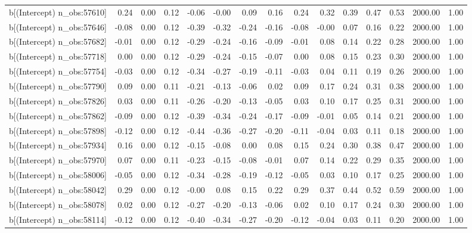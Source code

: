 \begin{table}[ht]
\begin{tabular}{rrrrrrrrrrrrrrr}
  b[(Intercept) n\_obs:57610] & 0.24 & 0.00 & 0.12 & -0.06 & -0.00 & 0.09 & 0.16 & 0.24 & 0.32 & 0.39 & 0.47 & 0.53 & 2000.00 & 1.00 \\ 
  b[(Intercept) n\_obs:57646] & -0.08 & 0.00 & 0.12 & -0.39 & -0.32 & -0.24 & -0.16 & -0.08 & -0.00 & 0.07 & 0.16 & 0.22 & 2000.00 & 1.00 \\ 
  b[(Intercept) n\_obs:57682] & -0.01 & 0.00 & 0.12 & -0.29 & -0.24 & -0.16 & -0.09 & -0.01 & 0.08 & 0.14 & 0.22 & 0.28 & 2000.00 & 1.00 \\ 
  b[(Intercept) n\_obs:57718] & 0.00 & 0.00 & 0.12 & -0.29 & -0.24 & -0.15 & -0.07 & 0.00 & 0.08 & 0.15 & 0.23 & 0.30 & 2000.00 & 1.00 \\ 
  b[(Intercept) n\_obs:57754] & -0.03 & 0.00 & 0.12 & -0.34 & -0.27 & -0.19 & -0.11 & -0.03 & 0.04 & 0.11 & 0.19 & 0.26 & 2000.00 & 1.00 \\ 
  b[(Intercept) n\_obs:57790] & 0.09 & 0.00 & 0.11 & -0.21 & -0.13 & -0.06 & 0.02 & 0.09 & 0.17 & 0.24 & 0.31 & 0.38 & 2000.00 & 1.00 \\ 
  b[(Intercept) n\_obs:57826] & 0.03 & 0.00 & 0.11 & -0.26 & -0.20 & -0.13 & -0.05 & 0.03 & 0.10 & 0.17 & 0.25 & 0.31 & 2000.00 & 1.00 \\ 
  b[(Intercept) n\_obs:57862] & -0.09 & 0.00 & 0.12 & -0.39 & -0.34 & -0.24 & -0.17 & -0.09 & -0.01 & 0.05 & 0.14 & 0.21 & 2000.00 & 1.00 \\ 
  b[(Intercept) n\_obs:57898] & -0.12 & 0.00 & 0.12 & -0.44 & -0.36 & -0.27 & -0.20 & -0.11 & -0.04 & 0.03 & 0.11 & 0.18 & 2000.00 & 1.00 \\ 
  b[(Intercept) n\_obs:57934] & 0.16 & 0.00 & 0.12 & -0.15 & -0.08 & 0.00 & 0.08 & 0.15 & 0.24 & 0.30 & 0.38 & 0.47 & 2000.00 & 1.00 \\ 
  b[(Intercept) n\_obs:57970] & 0.07 & 0.00 & 0.11 & -0.23 & -0.15 & -0.08 & -0.01 & 0.07 & 0.14 & 0.22 & 0.29 & 0.35 & 2000.00 & 1.00 \\ 
  b[(Intercept) n\_obs:58006] & -0.05 & 0.00 & 0.12 & -0.34 & -0.28 & -0.19 & -0.12 & -0.05 & 0.03 & 0.10 & 0.17 & 0.25 & 2000.00 & 1.00 \\ 
  b[(Intercept) n\_obs:58042] & 0.29 & 0.00 & 0.12 & -0.00 & 0.08 & 0.15 & 0.22 & 0.29 & 0.37 & 0.44 & 0.52 & 0.59 & 2000.00 & 1.00 \\ 
  b[(Intercept) n\_obs:58078] & 0.02 & 0.00 & 0.12 & -0.27 & -0.20 & -0.13 & -0.06 & 0.02 & 0.10 & 0.17 & 0.24 & 0.30 & 2000.00 & 1.00 \\ 
  b[(Intercept) n\_obs:58114] & -0.12 & 0.00 & 0.12 & -0.40 & -0.34 & -0.27 & -0.20 & -0.12 & -0.04 & 0.03 & 0.11 & 0.20 & 2000.00 & 1.00 \\ 

\end{tabular}
\end{table}
